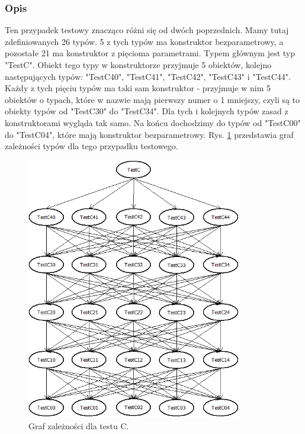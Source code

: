 \documentclass[12pt]{article}
\begin{document}
\subsubsection{Opis}
Ten przypadek testowy znacząco różni się od dwóch poprzednich. Mamy tutaj zdefiniowanych 26 typów. 5 z tych typów ma konstruktor bezparametrowy, a pozostałe 21 ma konstruktor z pięcioma parametrami. Typem głównym jest typ "TestC". Obiekt tego typy w konstruktorze przyjmuje 5 obiektów, kolejno następujących typów: "TestC40", "TestC41", "TestC42", "TestC43" i "TestC44". Każdy z tych pięciu typów ma taki sam konstruktor - przyjmuje w nim 5 obiektów o typach, które w nazwie mają pierwszy numer o 1 mniejszy, czyli są to obiekty typów od "TestC30" do "TestC34". Dla tych i kolejnych typów zasad z konstruktorami wygląda tak samo. Na końcu dochodzimy do typów od "TestC00" do "TestC04", które mają konstruktor bezparametrowy. Rys. \ref{fig:testC} przedstawia graf zależności typów dla tego przypadku testowego.\\
\begin{figure}[H]
	\begin{center}
  		\includegraphics[height=11.5cm]{TestC.png}
  		\caption{Graf zależności dla testu C.}
  		\label{fig:testC}
	\end{center}
\end{figure}
\end{document}
